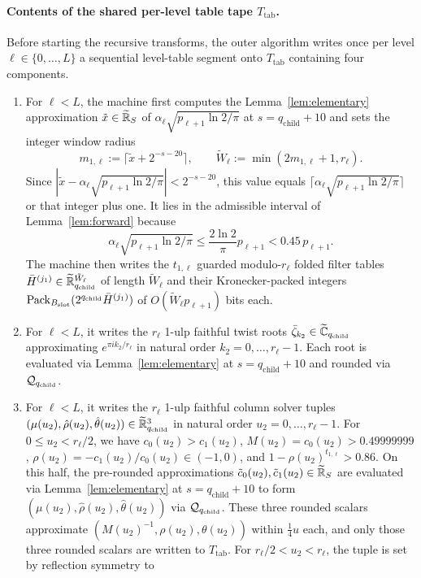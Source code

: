 \paragraph{Contents of the shared per-level table tape $T_{\mathrm{tab}}$.}
Before starting the recursive transforms, the outer algorithm writes once per level $\ell \in \{0, \dots, L\}$ a sequential level-table segment onto $T_{\mathrm{tab}}$ containing four components.
\begin{enumerate}[label=(\alph*),leftmargin=*]
  \item For $\ell < L$, the machine first computes the Lemma~\ref{lem:elementary} approximation $\tilde{x} \in \widetilde{\mathbb{R}}_S$ of $\alpha_\ell\sqrt{p_{\ell+1}\ln 2/\pi}$ at $s = q_{\mathrm{child}} + 10$ and sets the integer window radius
  \[
    m_{1,\ell} := \bigl\lceil \tilde{x} + 2^{-s-20} \bigr\rceil, \qquad \tilde{W}_\ell := \min(2m_{1,\ell}+1, r_\ell).
  \]
  Since $|\tilde{x} - \alpha_\ell\sqrt{p_{\ell+1}\ln 2/\pi}| < 2^{-s-20}$, this value equals $\lceil \alpha_\ell\sqrt{p_{\ell+1}\ln 2/\pi} \rceil$ or that integer plus one. It lies in the admissible interval of Lemma~\ref{lem:forward} because
  \[
    \alpha_\ell\sqrt{p_{\ell+1}\ln 2/\pi} \le \frac{2\ln 2}{\pi}p_{\ell+1} < 0.45\,p_{\ell+1}.
  \]
  The machine then writes the $t_{1,\ell}$ guarded modulo-$r_\ell$ folded filter tables $\bar{H}^{(j_1)} \in \widetilde{\mathbb{R}}_{q_{\mathrm{child}}}^{\tilde{W}_\ell}$ of length $\tilde{W}_\ell$ and their Kronecker-packed integers $\operatorname{Pack}_{B_{\mathrm{slot}}}(2^{q_{\mathrm{child}}}\bar{H}^{(j_1)})$ of $O(\tilde{W}_\ell p_{\ell+1})$ bits each.
  \item For $\ell < L$, it writes the $r_\ell$ 1-ulp faithful twist roots $\bar{\zeta}_{k_2} \in \widetilde{\mathbb{C}}_{q_{\mathrm{child}}}$ approximating $e^{\pi i k_2 / r_\ell}$ in natural order $k_2 = 0, \dots, r_\ell - 1$. Each root is evaluated via Lemma~\ref{lem:elementary} at $s = q_{\mathrm{child}} + 10$ and rounded via $\mathcal{Q}_{q_{\mathrm{child}}}$.
  \item For $\ell < L$, it writes the $r_\ell$ 1-ulp faithful column solver tuples $(\mu(u_2),\allowbreak \hat{\rho}(u_2),\allowbreak \hat{\theta}(u_2)) \in \widetilde{\mathbb{R}}_{q_{\mathrm{child}}}^3$ in natural order $u_2 = 0, \dots, r_\ell - 1$. For $0 \le u_2 < r_\ell / 2$, we have $c_0(u_2) > c_1(u_2)$, $M(u_2) = c_0(u_2) > 0.49999999$, $\rho(u_2) = -c_1(u_2)/c_0(u_2) \in (-1, 0)$, and $1 - \rho(u_2)^{t_{1,\ell}} > 0.86$. On this half, the pre-rounded approximations $\tilde{c}_0(u_2), \tilde{c}_1(u_2) \in \widetilde{\mathbb{R}}_S$ are evaluated via Lemma~\ref{lem:elementary} at $s = q_{\mathrm{child}} + 10$ to form $(\mu(u_2),\allowbreak \hat{\rho}(u_2),\allowbreak \hat{\theta}(u_2))$ via $\mathcal{Q}_{q_{\mathrm{child}}}$. These three rounded scalars approximate $(M(u_2)^{-1},\allowbreak \rho(u_2),\allowbreak \theta(u_2))$ within $\frac{1}{4}u$ each, and only those three rounded scalars are written to $T_{\mathrm{tab}}$. For $r_\ell / 2 < u_2 < r_\ell$, the tuple is set by reflection symmetry to

\end{enumerate}
